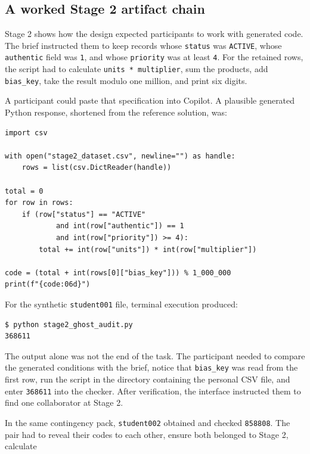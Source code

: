 \documentclass[11pt,a4paper]{article}
\begin{document}
\subsection{A worked Stage 2 artifact chain}

Stage 2 shows how the design expected participants to work with generated code. The brief instructed them to keep records whose \texttt{status} was \texttt{ACTIVE}, whose \texttt{authentic} field was \texttt{1}, and whose \texttt{priority} was at least \texttt{4}. For the retained rows, the script had to calculate \texttt{units * multiplier}, sum the products, add \texttt{bias\_key}, take the result modulo one million, and print six digits.

A participant could paste that specification into Copilot. A plausible generated Python response, shortened from the reference solution, was:

\begin{lstlisting}[style=artifact,caption={A compact Stage 2 solution produced from the task specification.}]
import csv

with open("stage2_dataset.csv", newline="") as handle:
    rows = list(csv.DictReader(handle))

total = 0
for row in rows:
    if (row["status"] == "ACTIVE"
            and int(row["authentic"]) == 1
            and int(row["priority"]) >= 4):
        total += int(row["units"]) * int(row["multiplier"])

code = (total + int(rows[0]["bias_key"])) % 1_000_000
print(f"{code:06d}")
\end{lstlisting}

For the synthetic \texttt{student001} file, terminal execution produced:

\begin{verbatim}
$ python stage2_ghost_audit.py
368611
\end{verbatim}

The output alone was not the end of the task. The participant needed to compare the generated conditions with the brief, notice that \texttt{bias\_key} was read from the first row, run the script in the directory containing the personal CSV file, and enter \texttt{368611} into the checker. After verification, the interface instructed them to find one collaborator at Stage 2.

In the same contingency pack, \texttt{student002} obtained and checked \texttt{858808}. The pair had to reveal their codes to each other, ensure both belonged to Stage 2, calculate
\end{document}
